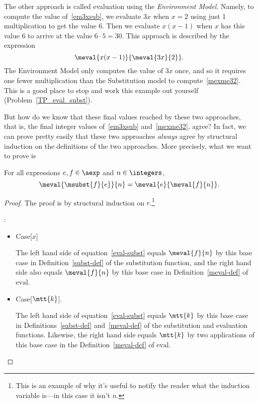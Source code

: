 \begin{definition}
The other approach is called evaluation using the \emph{Environment
  Model}.  Namely, to compute the value of~\eqref{em3xsub},
we evaluate $3x$ when $x = 2$ using just 1 multiplication to get the value
6.  Then we evaluate $x(x-1)$ when $x$ has this value 6 to arrive at the
value $6\cdot 5=30$.  This approach is described by the expression
\begin{equation}\label{mexme32}
\meval{x(x-1)}{\meval{3x}{2}}.
\end{equation}
The Environment Model only computes the value of $3x$ once, and so
it requires one fewer multiplication than the Substitution model to
compute~\eqref{mexme32}.  This is a good place to stop and work this
example out yourself (Problem~\ref{TP_eval_subst}).

But how do we know that these final values reached by these two
approaches, that is, the final integer values of~\eqref{em3xsub}
and~\eqref{mexme32}, agree?  In fact, we can prove pretty easily that
these two approaches \emph{always} agree by structural induction on
the definitions of the two approaches.  More precisely, what we want
to prove is
\begin{theorem}\label{environments}
For all expressions $e,f \in \aexp$ and $n \in \integers$,
\begin{equation}\label{eval-subst}
\meval{\msubst{f}{e}}{n} = \meval{e}{\meval{f}{n}}.
\end{equation}
\end{theorem}

\begin{proof}
The proof is by structural induction on $e$.\footnote{This is an
  example of why it's useful to notify the reader what the induction
  variable is---in this case it isn't $n$.}

:
\begin{itemize}

\item Case[$x$]

  The left hand side of equation~\eqref{eval-subst} equals $\meval{f}{n}$
  by this base case in Definition~\ref{subst-def} of the substitution
  function, and the right hand side also equals $\meval{f}{n}$ by this base
  case in Definition~\ref{meval-def} of $\text{eval}$.

\item Case[$\mtt{k}$].

  The left hand side of equation~\eqref{eval-subst} equals $\mtt{k}$ by
  this base case in Definitions~\ref{subst-def} and~\ref{meval-def} of
  the substitution and evaluation functions.  Likewise, the right hand
  side equals $\mtt{k}$ by two applications of this base case in the
  Definition~\ref{meval-def} of $\text{eval}$.


\end{itemize}
\end{proof}
\end{definition}
